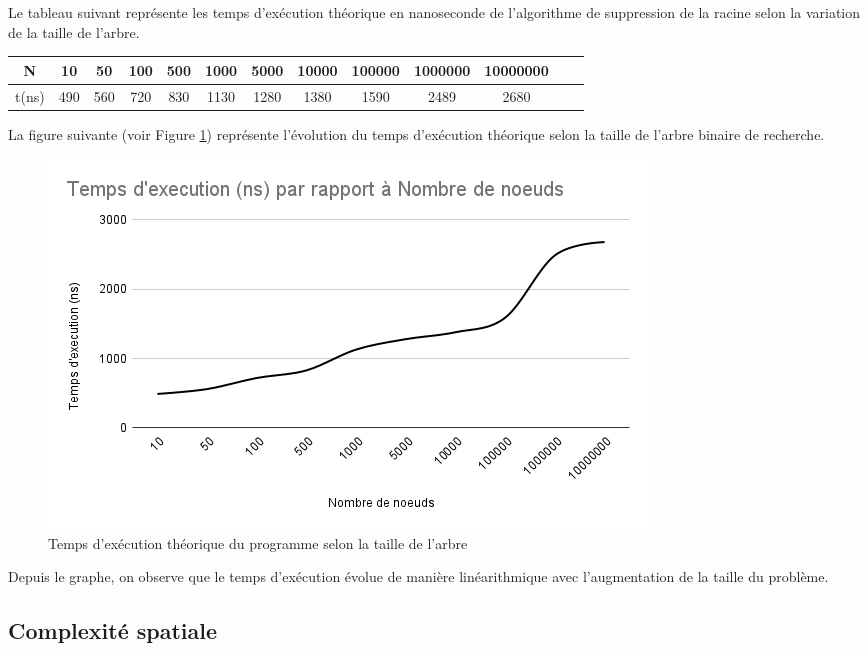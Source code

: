 Le tableau suivant représente les temps d'exécution théorique en nanoseconde de l'algorithme de suppression de la racine selon la variation de la taille de l'arbre.

\small
\begin{center}
\begin{tabular}{| c | c | c | c | c | c | c | c | c | c | c | c | c |}
    \hline
    N &  10 & 50 & 100 & 500 & 1000 & 5000 & 10000 & 100000 & 1000000 & 10000000 \\
    \hline
    t(ns) & 490 & 560 & 720 & 830 & 1130 & 1280 & 1380 & 1590 &  2489 & 2680  \\
    
    \hline
\end{tabular}  
\end{center}

La figure suivante (voir Figure \ref{fig:temps_exec_abr_theo}) représente l'évolution du temps d'exécution théorique selon la taille de l'arbre binaire de recherche.

\begin{figure}[H]
    \centering
        \includegraphics[scale=0.7]{./ressources/exe theo.png}
        \caption{Temps d'exécution théorique du programme selon la taille de l'arbre}
    \label{fig:temps_exec_abr_theo}
\end{figure} 

Depuis le graphe,  on observe que le temps d'exécution évolue de manière linéarithmique avec l'augmentation de la taille du problème.

\subsection{Complexité spatiale}

